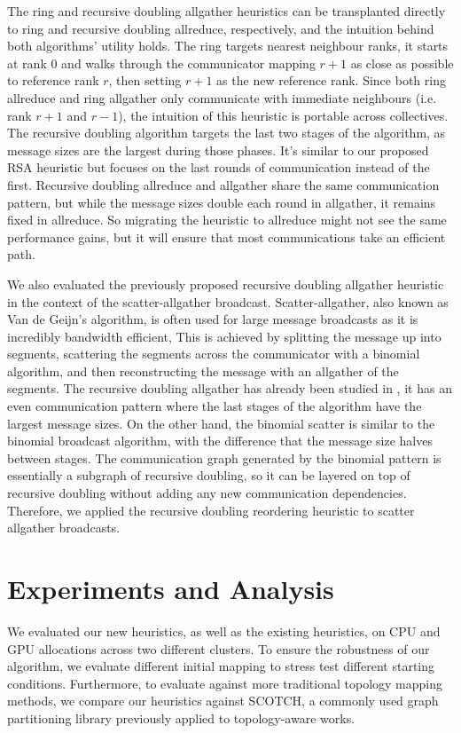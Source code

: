 The ring and recursive doubling allgather heuristics can be transplanted directly to ring and recursive doubling allreduce, respectively, and the intuition behind both algorithms' utility holds. 
The ring targets nearest neighbour ranks, it starts at rank 0 and walks through the communicator mapping $r+1$ as close as possible to reference rank $r$, then setting $r+1$ as the new reference rank.
Since both ring allreduce and ring allgather only communicate with immediate neighbours (i.e. rank $r+1$ and $r-1$), the intuition of this heuristic is portable across collectives.
The recursive doubling algorithm targets the last two stages of the algorithm, as message sizes are the largest during those phases. 
It's similar to our proposed RSA heuristic but focuses on the last rounds of communication instead of the first. 
Recursive doubling allreduce and allgather share the same communication pattern, but while the message sizes double each round in allgather,  it remains fixed in allreduce.
So migrating the heuristic to allreduce might not see the same performance gains, but it will ensure that most communications take an efficient path.

We also evaluated the previously proposed recursive doubling allgather heuristic in the context of the scatter-allgather broadcast.
Scatter-allgather, also known as Van de Geijn's algorithm, is often used for large message broadcasts as it is incredibly bandwidth efficient, 
This is achieved by splitting the message up into segments, scattering the segments across the communicator with a binomial algorithm, and then reconstructing the message with an allgather of the segments.
The recursive doubling allgather has already been studied in \cite{Mirsadeghi2016TopoAwareCollRR}, it has an even communication pattern where the last stages of the algorithm have the largest message sizes.
On the other hand, the binomial scatter is similar to the binomial broadcast algorithm, with the difference that the message size halves between stages. 
The communication graph generated by the binomial pattern is essentially a subgraph of recursive doubling, so it can be layered on top of recursive doubling without adding any new communication dependencies. 
Therefore, we applied the recursive doubling reordering heuristic to scatter allgather broadcasts.

\section{Experiments and Analysis}
We evaluated our new heuristics, as well as the existing heuristics, on CPU and GPU allocations across two different clusters.
To ensure the robustness of our algorithm, we evaluate different initial mapping to stress test different starting conditions.
Furthermore, to evaluate against more traditional topology mapping methods, we compare our heuristics against SCOTCH, a commonly used graph partitioning library previously applied to topology-aware works.

